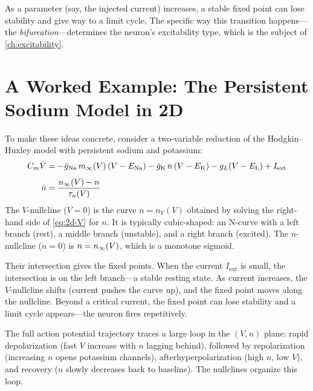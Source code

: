 As a parameter (say, the injected current) increases, a stable fixed point can lose stability and give way to a limit cycle. The specific way this transition happens---the \emph{bifurcation}---determines the neuron's excitability type, which is the subject of \cref{ch:excitability}.

\section{A Worked Example: The Persistent Sodium Model in 2D}
\label{sec:persistent-na-2d}

To make these ideas concrete, consider a two-variable reduction of the Hodgkin--Huxley model with persistent sodium and potassium:
%
\begin{align}
  C_m\dot{V} &= -\bar{g}_{\mathrm{Na}}\,m_\infty(V)\,(V - E_{\mathrm{Na}}) - \bar{g}_{\mathrm{K}}\,n\,(V - E_{\mathrm{K}}) - g_L(V - E_{\mathrm{L}}) + I_{\text{ext}} \label{eq:2d-V} \\[4pt]
  \dot{n} &= \frac{n_\infty(V) - n}{\tau_n(V)} \label{eq:2d-n}
\end{align}
%
The $V$-nullcline ($\dot{V} = 0$) is the curve $n = n_V(V)$ obtained by solving the right-hand side of \cref{eq:2d-V} for $n$. It is typically cubic-shaped: an N-curve with a left branch (rest), a middle branch (unstable), and a right branch (excited). The $n$-nullcline ($\dot{n} = 0$) is $n = n_\infty(V)$, which is a monotone sigmoid.

Their intersection gives the fixed points. When the current $I_{\text{ext}}$ is small, the intersection is on the left branch---a stable resting state. As current increases, the $V$-nullcline shifts (current pushes the curve up), and the fixed point moves along the nullcline. Beyond a critical current, the fixed point can lose stability and a limit cycle appears---the neuron fires repetitively.

The full action potential trajectory traces a large loop in the $(V, n)$ plane: rapid depolarization (fast $V$ increase with $n$ lagging behind), followed by repolarization (increasing $n$ opens potassium channels), afterhyperpolarization (high $n$, low $V$), and recovery ($n$ slowly decreases back to baseline). The nullclines organize this loop.


